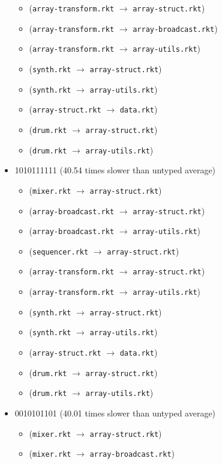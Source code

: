 \documentclass{article}
\newcommand{\mono}[1]{\texttt{#1}}
\begin{document}
\begin{itemize}
\begin{itemize}
  \item (\mono{array-transform.rkt} $\rightarrow$ \mono{array-struct.rkt})
  \item (\mono{array-transform.rkt} $\rightarrow$ \mono{array-broadcast.rkt})
  \item (\mono{array-transform.rkt} $\rightarrow$ \mono{array-utils.rkt})
  \item (\mono{synth.rkt} $\rightarrow$ \mono{array-struct.rkt})
  \item (\mono{synth.rkt} $\rightarrow$ \mono{array-utils.rkt})
  \item (\mono{array-struct.rkt} $\rightarrow$ \mono{data.rkt})
  \item (\mono{drum.rkt} $\rightarrow$ \mono{array-struct.rkt})
  \item (\mono{drum.rkt} $\rightarrow$ \mono{array-utils.rkt})
  \end{itemize}
\item 1010111111 (40.54 times slower than untyped average)
  \begin{itemize}
  \item (\mono{mixer.rkt} $\rightarrow$ \mono{array-struct.rkt})
  \item (\mono{array-broadcast.rkt} $\rightarrow$ \mono{array-struct.rkt})
  \item (\mono{array-broadcast.rkt} $\rightarrow$ \mono{array-utils.rkt})
  \item (\mono{sequencer.rkt} $\rightarrow$ \mono{array-struct.rkt})
  \item (\mono{array-transform.rkt} $\rightarrow$ \mono{array-struct.rkt})
  \item (\mono{array-transform.rkt} $\rightarrow$ \mono{array-utils.rkt})
  \item (\mono{synth.rkt} $\rightarrow$ \mono{array-struct.rkt})
  \item (\mono{synth.rkt} $\rightarrow$ \mono{array-utils.rkt})
  \item (\mono{array-struct.rkt} $\rightarrow$ \mono{data.rkt})
  \item (\mono{drum.rkt} $\rightarrow$ \mono{array-struct.rkt})
  \item (\mono{drum.rkt} $\rightarrow$ \mono{array-utils.rkt})
  \end{itemize}
\item 0010101101 (40.01 times slower than untyped average)
  \begin{itemize}
  \item (\mono{mixer.rkt} $\rightarrow$ \mono{array-struct.rkt})
  \item (\mono{mixer.rkt} $\rightarrow$ \mono{array-broadcast.rkt})

\end{itemize}
\end{itemize}
\end{document}
